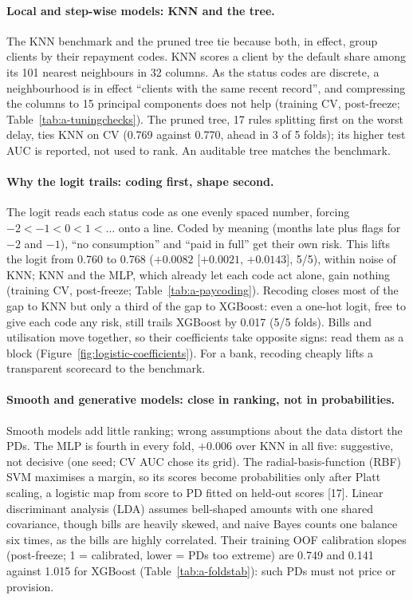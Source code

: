 \paragraph{Local and step-wise models: KNN and the tree.}
The KNN benchmark and the pruned tree tie because both, in effect, group clients by their repayment codes. KNN scores a client by the default share among its 101 nearest neighbours in 32 columns. As the status codes are discrete, a neighbourhood is in effect ``clients with the same recent record'', and compressing the columns to 15 principal components does not help (training CV, post-freeze; Table~\ref{tab:a-tuningchecks}). The pruned tree, 17 rules splitting first on the worst delay, ties KNN on CV (0.769 against 0.770, ahead in 3 of 5 folds); its higher test AUC is reported, not used to rank. An auditable tree matches the benchmark.

\paragraph{Why the logit trails: coding first, shape second.}
The logit reads each status code as one evenly spaced number, forcing $-2 < -1 < 0 < 1 < \dots$ onto a line. Coded by meaning (months late plus flags for $-2$ and $-1$), ``no consumption'' and ``paid in full'' get their own risk. This lifts the logit from 0.760 to 0.768 ($+0.0082$ [$+0.0021$, $+0.0143$], 5/5), within noise of KNN; KNN and the MLP, which already let each code act alone, gain nothing (training CV, post-freeze; Table~\ref{tab:a-paycoding}). Recoding closes most of the gap to KNN but only a third of the gap to XGBoost: even a one-hot logit, free to give each code any risk, still trails XGBoost by 0.017 (5/5 folds). Bills and utilisation move together, so their coefficients take opposite signs: read them as a block (Figure~\ref{fig:logistic-coefficients}). For a bank, recoding cheaply lifts a transparent scorecard to the benchmark.

\paragraph{Smooth and generative models: close in ranking, not in probabilities.}
Smooth models add little ranking; wrong assumptions about the data distort the PDs. The MLP is fourth in every fold, $+0.006$ over KNN in all five: suggestive, not decisive (one seed; CV AUC chose its grid). The radial-basis-function (RBF) SVM maximises a margin, so its scores become probabilities only after Platt scaling, a logistic map from score to PD fitted on held-out scores [17]. Linear discriminant analysis (LDA) assumes bell-shaped amounts with one shared covariance, though bills are heavily skewed, and naive Bayes counts one balance six times, as the bills are highly correlated. Their training OOF calibration slopes (post-freeze; 1 = calibrated, lower = PDs too extreme) are 0.749 and 0.141 against 1.015 for XGBoost (Table~\ref{tab:a-foldstab}): such PDs must not price or provision.

